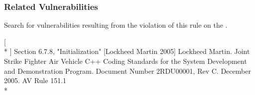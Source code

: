    \subsubsection{Related Vulnerabilities}

   Search for vulnerabilities resulting from the violation of this rule on the  .

    [ \\*
    ] Section 6.7.8, "Initialization" [Lockheed Martin 2005] Lockheed Martin. Joint Strike Fighter Air Vehicle C++ Coding Standards for the System Development and Demonstration Program. Document Number 2RDU00001, Rev C. December 2005. AV Rule 151.1 \\*
